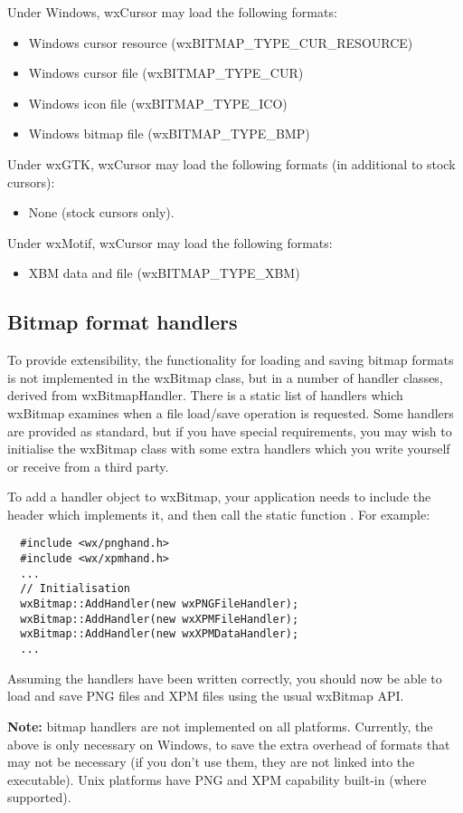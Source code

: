 
Under Windows, wxCursor may load the following formats:

\begin{itemize}\itemsep=0pt
\item Windows cursor resource (wxBITMAP\_TYPE\_CUR\_RESOURCE)
\item Windows cursor file (wxBITMAP\_TYPE\_CUR)
\item Windows icon file (wxBITMAP\_TYPE\_ICO)
\item Windows bitmap file (wxBITMAP\_TYPE\_BMP)
\end{itemize}

Under wxGTK, wxCursor may load the following formats (in additional
to stock cursors):

\begin{itemize}\itemsep=0pt
\item None (stock cursors only).
\end{itemize}

Under wxMotif, wxCursor may load the following formats:

\begin{itemize}\itemsep=0pt
\item XBM data and file (wxBITMAP\_TYPE\_XBM)
\end{itemize}

\subsection{Bitmap format handlers}\label{bitmaphandlers}

To provide extensibility, the functionality for loading and saving bitmap formats
is not implemented in the wxBitmap class, but in a number of handler classes,
derived from wxBitmapHandler. There is a static list of handlers which wxBitmap
examines when a file load/save operation is requested. Some handlers are provided as standard, but if you
have special requirements, you may wish to initialise the wxBitmap class with
some extra handlers which you write yourself or receive from a third party.

To add a handler object to wxBitmap, your application needs to include the header which implements it, and
then call the static function . For example:

{\small
\begin{verbatim}
  #include <wx/pnghand.h>
  #include <wx/xpmhand.h>
  ...
  // Initialisation
  wxBitmap::AddHandler(new wxPNGFileHandler);
  wxBitmap::AddHandler(new wxXPMFileHandler);
  wxBitmap::AddHandler(new wxXPMDataHandler);
  ...
\end{verbatim}
}

Assuming the handlers have been written correctly, you should now be able to load and save PNG files
and XPM files using the usual wxBitmap API.

{\bf Note:} bitmap handlers are not implemented on all platforms. Currently, the above is only necessary on
Windows, to save the extra overhead of formats that may not be necessary (if you don't use them, they
are not linked into the executable). Unix platforms have PNG and XPM capability built-in (where supported).

